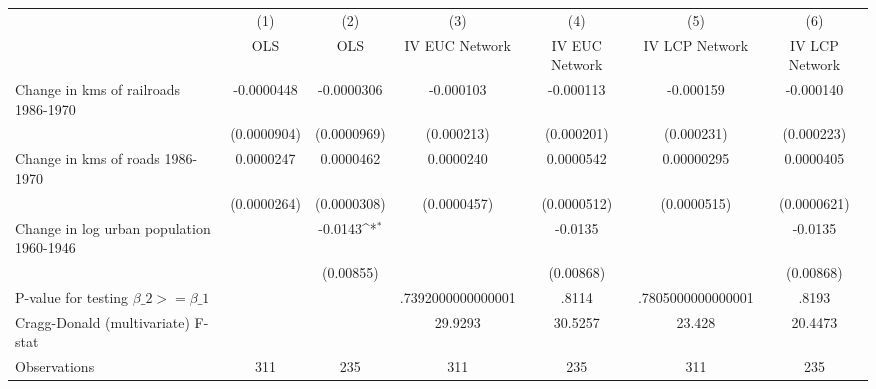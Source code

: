 {
\def\sym#1{\ifmmode^{#1}\else\(^{#1}\)\fi}
\begin{tabular}{l*{6}{c}}
\hline\hline
                &\multicolumn{1}{c}{(1)}&\multicolumn{1}{c}{(2)}&\multicolumn{1}{c}{(3)}&\multicolumn{1}{c}{(4)}&\multicolumn{1}{c}{(5)}&\multicolumn{1}{c}{(6)}\\
                &\multicolumn{1}{c}{OLS}&\multicolumn{1}{c}{OLS}&\multicolumn{1}{c}{IV EUC Network}&\multicolumn{1}{c}{IV EUC Network}&\multicolumn{1}{c}{IV LCP Network}&\multicolumn{1}{c}{IV LCP Network}\\
\hline
Change in kms of railroads 1986-1970&-0.0000448         &-0.0000306         &-0.000103         &-0.000113         &-0.000159         &-0.000140         \\
                &(0.0000904)         &(0.0000969)         &(0.000213)         &(0.000201)         &(0.000231)         &(0.000223)         \\
[1em]
Change in kms of roads 1986-1970&0.0000247         &0.0000462         &0.0000240         &0.0000542         &0.00000295         &0.0000405         \\
                &(0.0000264)         &(0.0000308)         &(0.0000457)         &(0.0000512)         &(0.0000515)         &(0.0000621)         \\
[1em]
Change in log urban population 1960-1946&                  &  -0.0143\sym{*}  &                  &  -0.0135         &                  &  -0.0135         \\
                &                  &(0.00855)         &                  &(0.00868)         &                  &(0.00868)         \\
\hline
P-value for testing $\beta\_{2} >= \beta\_{1}$&                  &                  &.7392000000000001         &    .8114         &.7805000000000001         &    .8193         \\
Cragg-Donald (multivariate) F-stat&                  &                  &  29.9293         &  30.5257         &   23.428         &  20.4473         \\
Observations    &      311         &      235         &      311         &      235         &      311         &      235         \\
\hline\hline
\end{tabular}
}
